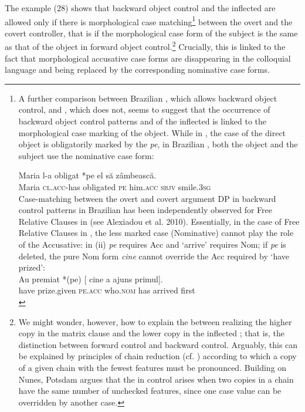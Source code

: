 \documentclass[output=paper]{langsci/langscibook}
\begin{document}
The example (28) shows that backward object control and the inflected  are allowed only if there is morphological case matching\footnote{A further comparison between Brazilian , which allows backward object control, and , which does not, seems to suggest that the occurrence of backward object control patterns and of the inflected  is linked to the morphological case marking of the object. While in , the case of the direct object is obligatorily marked by the  \textit{pe}, in Brazilian , both the object and the subject use the nominative case form: 

\ea\gll * Maria  l-a     obligat     *pe el            să      zâmbească.\\
        {} Maria  \textsc{cl.acc}{}-has        obligated     \textsc{pe} him\textsc{.acc} \textsc{sbjv} smile\textsc{{}.3sg}\\
\z
Case-matching between the overt and covert argument DP in backward control patterns in Brazilian  has been independently observed for Free Relative Clauses in  (see Alexiadou et al. 2010). Essentially, in the case of Free Relative Clauses in , the less marked case (Nominative) cannot play the role of the Accusative: in (ii) \textit{pe} requires Acc and ‘arrive’ requires Nom; if \textit{pe} is deleted, the pure Nom form \textit{cine} cannot override the Acc required by ‘have prized’: 
\ea \citep{Alexiadou2010}\\\gll  Au    premiat       *(pe)     [ cine        a     ajuns    primul].\\
have prize.given   \textsc{pe.acc} {}  who.\textsc{nom} has arrived first\\
\z} between the overt and the covert controller, that is if the morphological case form of the subject is the same as that of the object in forward object control.\footnote{We might wonder, however, how to explain the  between realizing the higher copy in the matrix clause and the lower copy in the inflected ; that is, the distinction between forward control and backward control. Arguably, this  can be explained by principles of chain reduction (cf. \citealt{Nunes2004}) according to which a copy of a given chain with the fewest features must be pronounced. Building on Nunes, Potsdam argues that the  in control arises when two copies in a chain have the same number of unchecked features, since one case value can be overridden by another case.} Crucially, this is linked to the fact that morphological accusative case forms are disappearing in the colloquial language and being replaced by the corresponding nominative case forms.
\end{document}
